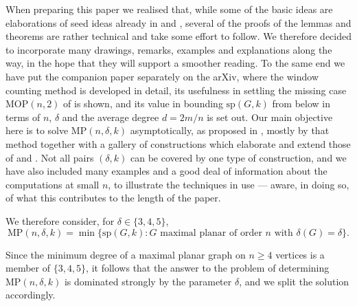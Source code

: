\documentclass[10pt,a4paper]{article}
\begin{document}
When preparing this paper we realised that, while some of the basic ideas are elaborations of seed ideas
already in \cite{CaroLauriZarb} and \cite{CaroWest}, several of the proofs of the lemmas and theorems are
rather technical and take some effort to follow. We therefore decided to incorporate many drawings, remarks,
examples and explanations along the way, in the hope that they will support a smoother reading. To the same
end we have put the companion paper \cite{P1} separately on the arXiv, where the window counting method is
developed in detail, its usefulness in settling the missing case $\mathrm{MOP}(n,2)$ of \cite{CaroLauriZarb}
is shown, and its value in bounding $\mathrm{sp}(G,k)$ from below in terms of $n$, $\delta $ and the average
degree $d=2m/n$ is set out. Our main objective here is to solve $\mathrm{MP}(n,\delta ,k)$ asymptotically,
as proposed in \cite{CaroLauriZarb}, mostly by that method together with a gallery of constructions which
elaborate and extend those of \cite{CaroLauriZarb} and \cite{CaroWest}. Not all pairs $(\delta ,k)$ can be
covered by one type of construction, and we have also included many examples and a good deal of information
about the computations at small $n$, to illustrate the techniques in use --- aware, in doing so, of what this
contributes to the length of the paper.



We therefore consider, for $\delta \in \{3,4,5\}$,
\[
\mathrm{MP}(n,\delta ,k)=\min \{\mathrm{sp}(G,k):G\text{ maximal planar of order }n\text{ with }\delta (G)=\delta \}.
\]


Since the minimum degree of a maximal planar graph on $n\geq 4$ vertices is a member of $\{3,4,5\}$, it follows
that the answer to the problem of determining $\mathrm{MP}(n,\delta ,k)$ is dominated strongly by the
parameter $\delta $, and we split the solution accordingly.
\end{document}
